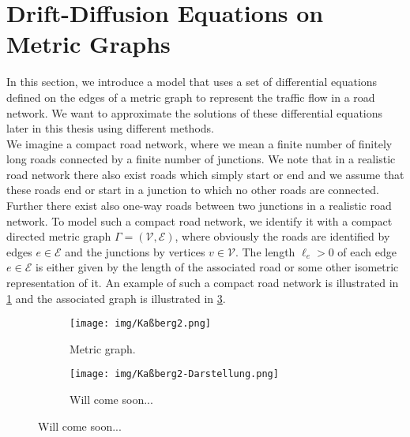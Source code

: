 \section{Drift-Diffusion Equations on Metric Graphs}
\label{ch1:sec2}

In this section, we introduce a model that uses a set of differential equations defined on the edges of a metric graph to represent the traffic flow in a road network. We want to approximate the solutions of these differential equations later in this thesis using different methods.  \\
We imagine a compact road network, where we mean a finite number of finitely long roads connected by a finite number of junctions. We note that in a realistic road network there also exist roads which simply start or end and we assume that these roads end or start in a junction to which no other roads are connected. Further there exist also one-way roads between two junctions in a realistic road network. To model such a compact road network, we identify it with a compact directed metric graph $\Gamma =  \left( \mathcal{V}, \mathcal{E} \right) $, where obviously the roads are identified by edges $e \in \mathcal{E}$ and the junctions by vertices $v \in \mathcal{V}$. The length $\ell_e > 0$ of each edge $e \in \mathcal{E}$ is either given by the length of the associated road or some other isometric representation of it. An example of such a compact road network is illustrated in \cref{fig8:f1} and the associated graph is illustrated in \cref{fig8:f2}. \\

\begin{figure}[H]
    \begin{center}
        \begin{subfigure}[b]{0.4\textwidth}
            \begin{center}
                \texttt{[image: img/Kaßberg2.png]}
            \end{center}
            \caption{Metric graph.}
            \label{fig8:f1}
        \end{subfigure}
        \begin{subfigure}[b]{0.4\textwidth}
            \begin{center}
                \texttt{[image: img/Kaßberg2-Darstellung.png]}
            \end{center}
            \caption{Will come soon...}
            \label{fig8:f2}
        \end{subfigure}
    \end{center}
    \caption{Will come soon...}
\end{figure}

